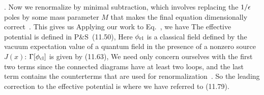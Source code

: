 \documentclass[11pt]{article}
\begin{document}
{{ 		\approx {} .
 	}
 	Now we renormalize by minimal subtraction, which involves replacing the $1 / \epsilon$ poles by some mass parameter $M$ that makes the final equation dimensionally correct~\cite[pp.~376--377]{Peskin}.  This gives us
  	Applying our work to Eq.~, we have
 	The effective potential is defined in P\&S~(11.50),
	Here $\phi_\text{cl}$ is a classical field defined by the vacuum expectation value of a quantum field in the presence of a nonzero source $J(x)$:
	$\Gamma[\phi_\text{cl}]$ is given by (11.63),
 	We need only concern ourselves with the first two terms since the connected diagrams have at least two loops, and the last term contains the counterterms that are used for renormalization~\cite[p.~372]{Peskin}.  So the leading correction to the effective potential is
 	where we have referred to (11.79).
}



\end{document}
